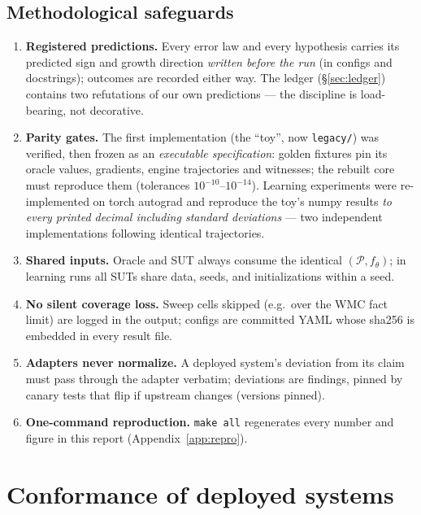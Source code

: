 \documentclass[10pt]{article}
\theoremstyle{remark}
\begin{document}
\subsection{Methodological safeguards}\label{sec:method}

\begin{enumerate}[leftmargin=2em]
\item \textbf{Registered predictions.} Every error law and every hypothesis carries its predicted
sign and growth direction \emph{written before the run} (in configs and docstrings); outcomes are
recorded either way. The ledger (\S\ref{sec:ledger}) contains two refutations of our own
predictions --- the discipline is load-bearing, not decorative.
\item \textbf{Parity gates.} The first implementation (the ``toy'', now \texttt{legacy/}) was
verified, then frozen as an \emph{executable specification}: golden fixtures pin its oracle
values, gradients, engine trajectories and witnesses; the rebuilt core must reproduce them
(tolerances $10^{-10}$--$10^{-14}$). Learning experiments were re-implemented on torch autograd
and reproduce the toy's numpy results \emph{to every printed decimal including standard
deviations} --- two independent implementations following identical trajectories.
\item \textbf{Shared inputs.} Oracle and SUT always consume the identical $(\mathcal P,
f_\theta)$; in learning runs all SUTs share data, seeds, and initializations within a seed.
\item \textbf{No silent coverage loss.} Sweep cells skipped (e.g.\ over the WMC fact limit) are
logged in the output; configs are committed YAML whose sha256 is embedded in every result file.
\item \textbf{Adapters never normalize.} A deployed system's deviation from its claim must pass
through the adapter verbatim; deviations are findings, pinned by canary tests that flip if
upstream changes (versions pinned).
\item \textbf{One-command reproduction.} \texttt{make all} regenerates every number and figure in
this report (Appendix~\ref{app:repro}).
\end{enumerate}

\section{Conformance of deployed systems}\label{sec:conformance}
\end{document}

